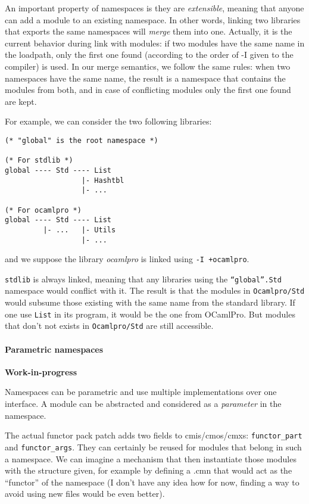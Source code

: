\documentclass[11pt,a4paper]{article}
\begin{document}
An important property of namespaces is they are \emph{extensible}, meaning that
anyone can add a module to an existing namespace. In other words, linking two
libraries that exports the same namespaces will \emph{merge} them into
one. Actually, it is the current behavior during link with modules: if two
modules have the same name in the loadpath, only the first one found (according
to the order of -I given to the compiler) is used. In our merge semantics, we
follow the same rules: when two namespaces have the same name, the result is a
namespace that contains the modules from both, and in case of conflicting
modules only the first one found are kept.

For example, we can consider the two following libraries:

\begin{verbatim}
(* "global" is the root namespace *)

(* For stdlib *)
global ---- Std ---- List
                  |- Hashtbl
                  |- ...

(* For ocamlpro *)
global ---- Std ---- List
         |- ...   |- Utils
                  |- ...
\end{verbatim}
and we suppose the library \emph{ocamlpro} is linked using \texttt{-I +ocamlpro}.

\texttt{stdlib} is always linked, meaning that any libraries using the
\texttt{``global''.Std} namespace would conflict with it. The result is that the
modules in \texttt{Ocamlpro/Std} would subsume those existing with the same name
from the standard library. If one use \texttt{List} in its program, it would be
the one from OCamlPro. But modules that don't not exists in
\texttt{Ocamlpro/Std} are still accessible.


\paragraph{Parametric namespaces}

\textbf{Work-in-progress}

Namespaces can be parametric and use multiple implementations over one
interface. A module can be abstracted and considered as a \emph{parameter} in
the namespace. 

The actual functor pack patch adds two fields to cmis/cmos/cmxs:
\lstinline{functor_part} and \lstinline{functor_args}. They can certainly be
reused for modules that belong in such a namespace. We can imagine a mechanism
that then instantiate those modules with the structure given, for example by
defining a .cmn that would act as the ``functor'' of the namespace (I don't have
any idea how for now, finding a way to avoid using new files would be even better).
\end{document}
